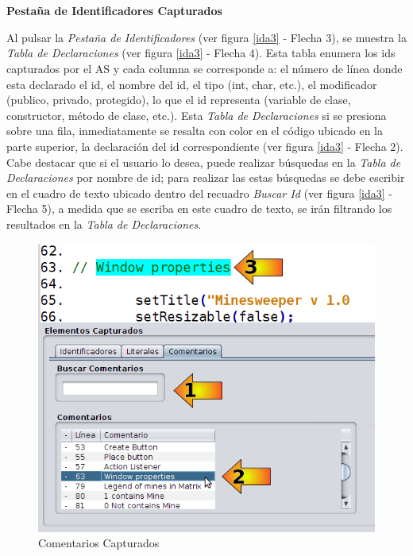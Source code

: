 \noindent \textbf{\\\\Pestaña de Identificadores Capturados\\} 

Al pulsar la \textit{Pestaña de Identificadores} (ver figura \ref{ida3} - Flecha 3), se muestra la \textit{Tabla de Declaraciones} (ver figura \ref{ida3} - Flecha 4). Esta tabla enumera los ids capturados por el AS y cada columna se corresponde a: el número de línea donde esta declarado el id, el nombre del id, el tipo (int, char, etc.), el modificador (publico, privado, protegido), lo que el id representa (variable de clase, constructor, método de clase, etc.).
Esta \textit{Tabla de Declaraciones} si se presiona sobre una fila, inmediatamente se resalta con color en el código ubicado en la parte superior, la declaración del id correspondiente (ver figura \ref{ida3} - Flecha 2). 
Cabe destacar que si el usuario lo desea, puede realizar búsquedas en la \textit{Tabla de Declaraciones} por nombre de id; para realizar las estas búsquedas se debe escribir en el cuadro de texto ubicado dentro del recuadro \textit{Buscar Id} (ver figura \ref{ida3} - Flecha 5), a medida que se escriba en este cuadro de texto, se irán filtrando los resultados en la \textit{Tabla de Declaraciones}.

\begin{figure}[t] %
\centerline{%
\includegraphics[scale= 0.55]{./cap4/ida_05.png}
}
\caption{Comentarios Capturados}
\label{ida5}
\end{figure}

